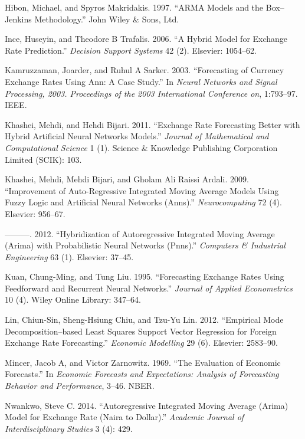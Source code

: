 \documentclass[12pt,preprint, authoryear]{elsarticle}
\numberwithin{equation}{section}
\numberwithin{figure}{section}
\numberwithin{table}{section}
\begin{document}
\hypertarget{ref-spyros1997}{}
Hibon, Michael, and Spyros Makridakis. 1997. ``ARMA Models and the
Box--Jenkins Methodology.'' John Wiley \& Sons, Ltd.

\hypertarget{ref-ince2006}{}
Ince, Huseyin, and Theodore B Trafalis. 2006. ``A Hybrid Model for
Exchange Rate Prediction.'' \emph{Decision Support Systems} 42 (2).
Elsevier: 1054--62.

\hypertarget{ref-kamruzzaman2003}{}
Kamruzzaman, Joarder, and Ruhul A Sarker. 2003. ``Forecasting of
Currency Exchange Rates Using Ann: A Case Study.'' In \emph{Neural
Networks and Signal Processing, 2003. Proceedings of the 2003
International Conference on}, 1:793--97. IEEE.

\hypertarget{ref-khashei2011}{}
Khashei, Mehdi, and Hehdi Bijari. 2011. ``Exchange Rate Forecasting
Better with Hybrid Artificial Neural Networks Models.'' \emph{Journal of
Mathematical and Computational Science} 1 (1). Science \& Knowledge
Publishing Corporation Limited (SCIK): 103.

\hypertarget{ref-khashei2009}{}
Khashei, Mehdi, Mehdi Bijari, and Gholam Ali Raissi Ardali. 2009.
``Improvement of Auto-Regressive Integrated Moving Average Models Using
Fuzzy Logic and Artificial Neural Networks (Anns).''
\emph{Neurocomputing} 72 (4). Elsevier: 956--67.

\hypertarget{ref-khashei2012}{}
---------. 2012. ``Hybridization of Autoregressive Integrated Moving
Average (Arima) with Probabilistic Neural Networks (Pnns).''
\emph{Computers \& Industrial Engineering} 63 (1). Elsevier: 37--45.

\hypertarget{ref-kuan1995}{}
Kuan, Chung-Ming, and Tung Liu. 1995. ``Forecasting Exchange Rates Using
Feedforward and Recurrent Neural Networks.'' \emph{Journal of Applied
Econometrics} 10 (4). Wiley Online Library: 347--64.

\hypertarget{ref-lin2012}{}
Lin, Chiun-Sin, Sheng-Hsiung Chiu, and Tzu-Yu Lin. 2012. ``Empirical
Mode Decomposition--based Least Squares Support Vector Regression for
Foreign Exchange Rate Forecasting.'' \emph{Economic Modelling} 29 (6).
Elsevier: 2583--90.

\hypertarget{ref-mincer1969}{}
Mincer, Jacob A, and Victor Zarnowitz. 1969. ``The Evaluation of
Economic Forecasts.'' In \emph{Economic Forecasts and Expectations:
Analysis of Forecasting Behavior and Performance}, 3--46. NBER.

\hypertarget{ref-nwankwo2014}{}
Nwankwo, Steve C. 2014. ``Autoregressive Integrated Moving Average
(Arima) Model for Exchange Rate (Naira to Dollar).'' \emph{Academic
Journal of Interdisciplinary Studies} 3 (4): 429.
\end{document}
